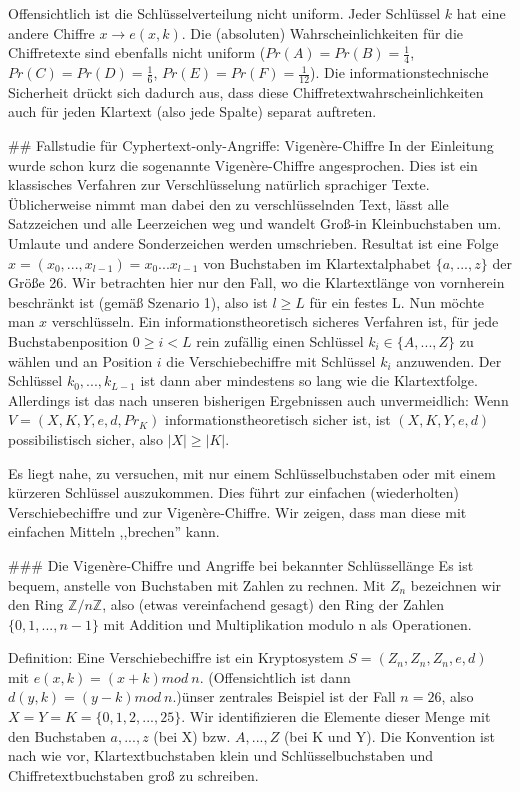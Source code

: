 \documentclass[a4paper]{article}
\begin{document}
\begin{multicols}{3}
Offensichtlich ist die Schlüsselverteilung nicht uniform. Jeder Schlüssel $k$ hat eine andere Chiffre $x\rightarrow e(x,k)$. Die (absoluten) Wahrscheinlichkeiten für die Chiffretexte sind ebenfalls nicht uniform ($Pr(A)=Pr(B)=\frac{1}{4}$, $Pr(C)=Pr(D)=\frac{1}{6}$, $Pr(E)=Pr(F)=\frac{1}{12}$). 
Die informationstechnische Sicherheit drückt sich dadurch aus, dass diese Chiffretextwahrscheinlichkeiten auch für jeden Klartext (also jede Spalte) separat auftreten.

## Fallstudie für Cyphertext-only-Angriffe: Vigenère-Chiffre
In der Einleitung wurde schon kurz die sogenannte Vigenère-Chiffre angesprochen. Dies ist ein klassisches Verfahren zur Verschlüsselung natürlich sprachiger Texte. Üblicherweise nimmt man dabei den zu verschlüsselnden Text, lässt alle Satzzeichen und alle Leerzeichen weg und wandelt Groß-in Kleinbuchstaben um. Umlaute und andere Sonderzeichen werden umschrieben. Resultat ist eine Folge $x=(x_0,...,x_{l-1})=x_0 ...x_{l-1}$ von Buchstaben im Klartextalphabet $\{a,...,z\}$ der Größe 26. Wir betrachten hier nur den Fall, wo die Klartextlänge von vornherein beschränkt ist (gemäß Szenario 1), also ist $l\geq L$ für ein festes L. Nun möchte man $x$ verschlüsseln. Ein informationstheoretisch sicheres Verfahren ist, für jede Buchstabenposition $0\geq i < L$ rein zufällig einen Schlüssel $k_i\in\{A,...,Z\}$ zu wählen und an Position $i$ die Verschiebechiffre mit Schlüssel $k_i$ anzuwenden. Der Schlüssel $k_0,...,k_{L-1}$ ist dann aber mindestens so lang wie die Klartextfolge. Allerdings ist das nach unseren bisherigen Ergebnissen auch unvermeidlich: Wenn $V=(X,K,Y,e,d,Pr_K)$ informationstheoretisch sicher ist, ist $(X,K,Y,e,d)$ possibilistisch sicher, also $|X|\geq |K|$.

Es liegt nahe, zu versuchen, mit nur einem Schlüsselbuchstaben oder mit einem kürzeren Schlüssel auszukommen. Dies führt zur einfachen (wiederholten) Verschiebechiffre und zur Vigenère-Chiffre. Wir zeigen, dass man diese mit einfachen Mitteln ,,brechen'' kann.

### Die Vigenère-Chiffre und Angriffe bei bekannter Schlüssellänge
Es ist bequem, anstelle von Buchstaben mit Zahlen zu rechnen. Mit $Z_n$ bezeichnen wir den Ring $\mathbb{Z}/n\mathbb{Z}$, also (etwas vereinfachend gesagt) den Ring der Zahlen $\{0,1,...,n-1\}$ mit Addition und Multiplikation modulo n als Operationen.

Definition: Eine Verschiebechiffre ist ein Kryptosystem $S=(Z_n,Z_n,Z_n,e,d)$ mit $e(x,k)=(x+k) mod\ n$. (Offensichtlich ist dann $d(y,k)=(y-k)mod\ n$.)ünser zentrales Beispiel ist der Fall $n=26$, also $X=Y=K=\{0,1,2,...,25\}$. Wir identifizieren die Elemente dieser Menge mit den Buchstaben $a,...,z$ (bei X) bzw. $A,...,Z$ (bei K und Y). Die Konvention ist nach wie vor, Klartextbuchstaben klein und Schlüsselbuchstaben und Chiffretextbuchstaben groß zu schreiben.


\end{multicols}
\end{document}
